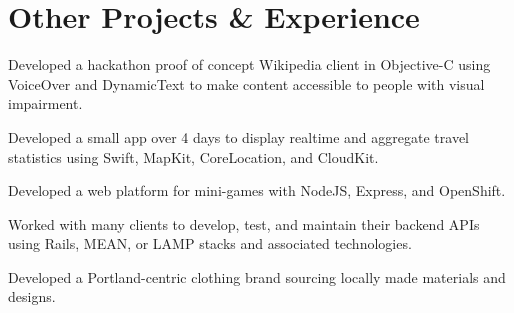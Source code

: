 \documentclass[]{jhearn-resume}
\begin{document}
\begin{minipage}[t]{0.64\textwidth} 
\vspace{-11pt}
\noindent\makebox[\linewidth]{\rule{1000pt}{0.4pt}}
\vspace{-5pt}

\section{Other Projects \& Experience}

\begin{tightemize}
\item Developed a hackathon proof of concept Wikipedia client in Objective-C using VoiceOver and DynamicText to make content accessible to people with visual impairment.
\end{tightemize}
\sectionsep

\begin{tightemize}
\item Developed a small app over 4 days to display realtime and aggregate travel statistics using Swift, MapKit, CoreLocation, and CloudKit.
\end{tightemize}
\sectionsep

\begin{tightemize}
\item Developed a web platform for mini-games with NodeJS, Express, and OpenShift.
\end{tightemize}
\sectionsep

\begin{tightemize}
\item Worked with many clients to develop, test, and maintain their backend APIs using Rails, MEAN, or LAMP stacks and associated technologies.
\end{tightemize}
\sectionsep

\begin{tightemize}
\item Developed a Portland-centric clothing brand sourcing locally made materials and designs.
\end{tightemize}
\sectionsep


\end{minipage}
\end{document}
